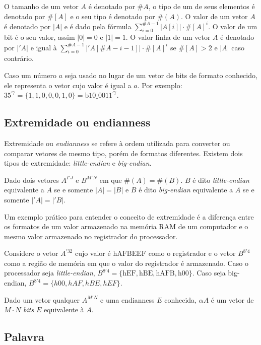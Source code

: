   O tamanho de um vetor $A$ é denotado por $\#A$, o tipo de um de seus elementos é denotado 
  por $\#[A]$ e o seu tipo é denotado por $\#(A)$.
  O valor de um vetor $A$ é denotado por $|A|$ e é dado pela fórmula $\sum_{i =0}^{\#A-1}
  |A[i]| \cdot \#[A]^i$. O valor de um bit é o seu valor, assim $|0| = 0$ e $|1| = 1$.
  O valor linha de um vetor $A$ é denotado por $|'A|$ e igual à $\sum_{i =0}^{\#A-1}
  |'A[\#A -i -1]| \cdot \#[A]^i$ se $\#[A] > 2$ e  $|A|$ caso contrário.

  Caso um número $a$ seja usado no lugar de um vetor de bits de formato conhecido, 
  ele representa o vetor cujo valor é igual a $a$. Por exemplo: $35^{'7} = \{1,1,0,0,0,1,0\}
  = \text{b}10\_0011^{'7}$.



\subsection{Extremidade ou endianness}
\label{sec:endianness}

  Extremidade ou \emph{endianness} se refere à ordem utilizada para converter ou comparar 
  vetores de mesmo tipo, porém de formatos diferentes. Existem dois tipos de extremidade:
  \emph{little-endian} e \emph{big-endian}.

  Dado dois vetores $A^{I'J}$ e $B^{M'N}$ em que $\#(A) = \#(B)$. $B$ é dito \emph{little-endian} 
  equivalente a $A$ se e somente $|A| = |B|$ e $B$ é dito \emph{big-endian} equivalente a $A$
  se e somente $|'A| = |'B|$.

  Um exemplo prático para entender o conceito de extremidade é a diferença entre os formatos
  de um valor armazenado na memória RAM de um computador e o mesmo valor armazenado no registrador
  do processador.

  Considere o vetor $A^{'32}$ cujo valor é $\text{hAFBEEF}$ como o registrador e o vetor $B^{8'4}$
  como a região de memória em que o valor do registrador é armazenado. Caso o processador seja 
  \emph{little-endian},  $B^{8'4} = \{ \text{hEF}, \text{hBE}, \text{hAFB}, \text{h}00 \}$. 
  Caso seja big-endian,  $B^{8'4} = \{ h00, hAF, hBE, hEF \}$.

  Dado um vetor qualquer $A^{M'N}$ e uma endianness $E$ conhecida, $\alpha A$ é um vetor de 
  $M \cdot N$ \emph{bits} $E$ equivalente à $A$.

\subsection{Palavra}
\label{sec:word}

